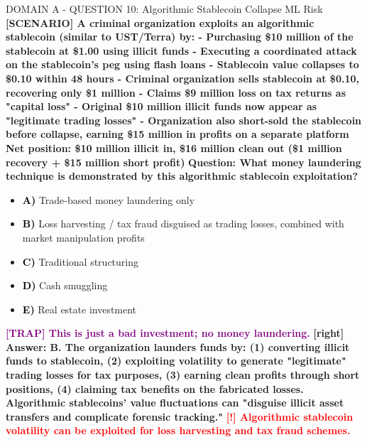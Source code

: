 \documentclass[11pt,a4paper]{beamer}
\newcommand{\redflag}[1]{\textcolor{red}{\textbf{[!] #1}}}
\newcommand{\trap}[1]{\textcolor{purple}{\textbf{[TRAP] #1}}}
\newcommand{\correct}[1]{\textcolor{green!50!black}{\textbf{[right] #1}}}
\newcommand{\scenario}[1]{\textcolor{blue!70!black}{\textbf{[SCENARIO] #1}}}
\newcommand{\option}[1]{\textcolor{black}{\textbf{#1}}}
\begin{document}
\begin{frame}{DOMAIN A - QUESTION 10: Algorithmic Stablecoin Collapse ML Risk}
\scenario{A criminal organization exploits an algorithmic stablecoin (similar to UST/Terra) by:
- Purchasing \$10 million of the stablecoin at \$1.00 using illicit funds
- Executing a coordinated attack on the stablecoin's peg using flash loans
- Stablecoin value collapses to \$0.10 within 48 hours
- Criminal organization sells stablecoin at \$0.10, recovering only \$1 million
- Claims \$9 million loss on tax returns as "capital loss"
- Original \$10 million illicit funds now appear as "legitimate trading losses"
- Organization also short-sold the stablecoin before collapse, earning \$15 million in profits on a separate platform
Net position: \$10 million illicit in, \$16 million clean out (\$1 million recovery + \$15 million short profit)}
\vspace{0.2cm}
\textbf{Question: What money laundering technique is demonstrated by this algorithmic stablecoin exploitation?}
\vspace{0.1cm}
\begin{itemize}
    \item \option{A)} Trade-based money laundering only
    \item \option{B)} Loss harvesting / tax fraud disguised as trading losses, combined with market manipulation profits
    \item \option{C)} Traditional structuring
    \item \option{D)} Cash smuggling
    \item \option{E)} Real estate investment
\end{itemize}
\vspace{0.2cm}
\trap{This is just a bad investment; no money laundering.}
\correct{Answer: B. The organization launders funds by: (1) converting illicit funds to stablecoin, (2) exploiting volatility to generate "legitimate" trading losses for tax purposes, (3) earning clean profits through short positions, (4) claiming tax benefits on the fabricated losses. Algorithmic stablecoins' value fluctuations can "disguise illicit asset transfers and complicate forensic tracking."}
\redflag{Algorithmic stablecoin volatility can be exploited for loss harvesting and tax fraud schemes.}
\end{frame}
\end{document}
